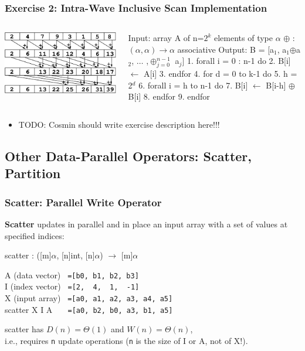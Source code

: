 \documentclass{beamer}
\renewcommand{\emph}[1]{\textcolor{CosGreen}{ #1}}
\newcommand{\emp}[1]{\textcolor{DikuRed}{ #1}}
\newcommand{\mymath}[1]{$ #1 $}
\newcommand{\myindx}[1]{_{#1}}
\newcommand{\myindu}[1]{^{#1}}
\begin{document}
\begin{frame}[fragile,t]
  \frametitle{Exercise 2: Intra-Wave Inclusive Scan Implementation}

\begin{columns}
\includegraphics[height=15ex]{img/day3/incScanGPU} 
\begin{colorcode}
Input:  array A of n=\mymath{2\myindu{k}} elements
                       of type \mymath{\alpha}
        \mymath{\oplus} : \mymath{(\alpha,\alpha)\to\alpha} associative
Output: B = [a\mymath{\myindx{1}}, a\mymath{\myindx{1}}\mymath{\oplus}a\mymath{\myindx{2}}, \mymath{\ldots} ,\mymath{\oplus\myindx{j=0}\myindu{n-1}} a\mymath{\myindx{j}}]
1.  forall i = 0 : n-1 do
2.    B[i] \mymath{\leftarrow} A[i]
3.  endfor
4.  for d = 0 to k-1 do
5.    h = 2\mymath{\myindu{d}}
6.    forall i = h to n-1 do 
7.      B[i] \mymath{\leftarrow} B[i-h] \mymath{\oplus} B[i]
8.    endfor
9.  endfor
\end{colorcode}
\end{columns}

\begin{itemize}
    \item TODO: Cosmin should write exercise description here!!!
\end{itemize}

\end{frame}

\subsection{Other Data-Parallel Operators: Scatter, Partition}

\begin{frame}[fragile,t]
  \frametitle{Scatter: Parallel Write Operator}

{\bf Scatter} \emph{updates in parallel and in place} an input array with a set of values at specified indices:
\smallskip

\emph{scatter : ([m]$\alpha$, [n]int, [n]$\alpha$) $\rightarrow$ [m]$\alpha$}
\bigskip

A (data vector)    {\tt~=[b0, b1, b2, b3]}\\
I (index vector)   {\tt~=[2,~~4,~~1,~~-1]}\\
X (input array)    {\tt~=[a0,~a1,~a2,~a3,~a4,~a5]}\\
\emp{scatter X I A {\tt~~~=[a0,~b2,~b0,~a3,~b1,~a5]}}
\bigskip\pause

\emph{scatter} has $D(n)=\Theta(1)$ and $W(n)=\Theta(n)$,\\
i.e., requires {\tt n} update operations ({\tt n} is the size of I or A, not of X!).\bigskip

\end{frame}
\end{document}
